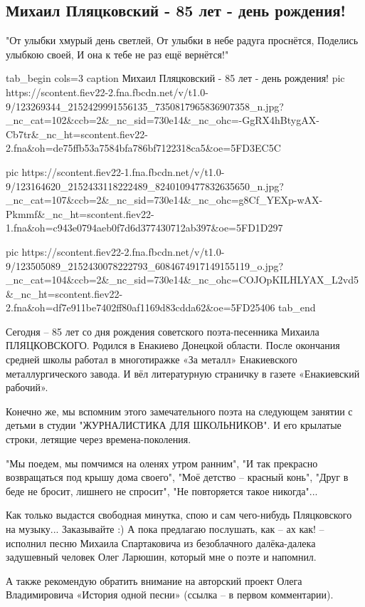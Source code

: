  
 
 

\subsection{Михаил Пляцковский - 85 лет - день рождения!}
\label{sec:02_11_2020.fb.roman_barashev.1.dr_mihail_pljackovskii_85}

\obeycr
"От улыбки хмурый день светлей,
От улыбки в небе радуга проснётся,
Поделись улыбкою своей,
И она к тебе не раз ещё вернётся!"
\restorecr

\ifcmt
tab_begin cols=3
	caption Михаил Пляцковский - 85 лет - день рождения!
pic https://scontent.fiev22-2.fna.fbcdn.net/v/t1.0-9/123269344_2152429991556135_7350817965836907358_n.jpg?_nc_cat=102&ccb=2&_nc_sid=730e14&_nc_ohc=-GgRX4hBtygAX-Cb7tr&_nc_ht=scontent.fiev22-2.fna&oh=de75ffb53a7584bfa786bf7122318ca5&oe=5FD3EC5C

pic https://scontent.fiev22-1.fna.fbcdn.net/v/t1.0-9/123164620_2152433118222489_8240109477832635650_n.jpg?_nc_cat=107&ccb=2&_nc_sid=730e14&_nc_ohc=g8Cf_YEXp-wAX-Pkmmf&_nc_ht=scontent.fiev22-1.fna&oh=c943e0794aeb0f7d6d377430712ab397&oe=5FD1D297

pic https://scontent.fiev22-2.fna.fbcdn.net/v/t1.0-9/123505089_2152430078222793_6084674917149155119_o.jpg?_nc_cat=104&ccb=2&_nc_sid=730e14&_nc_ohc=COJOpKILHLYAX_L2vd5&_nc_ht=scontent.fiev22-2.fna&oh=df7e911be7402ff80af1169d83cdda62&oe=5FD25406
tab_end
\fi

Сегодня -- 85 лет со дня рождения советского поэта-песенника  Михаила
ПЛЯЦКОВСКОГО. Родился в Енакиево Донецкой области. После окончания средней
школы работал в многотиражке «За металл» Енакиевского металлургического завода.
И вёл литературную страничку в газете «Енакиевский рабочий».

Конечно же, мы вспомним этого замечательного поэта на следующем занятии с
детьми в студии "ЖУРНАЛИСТИКА ДЛЯ ШКОЛЬНИКОВ". И его крылатые строки, летящие
через времена-поколения.

"Мы поедем, мы помчимся на оленях утром ранним", "И так прекрасно возвращаться
под крышу дома своего", "Моё детство -- красный конь", "Друг в беде не бросит,
лишнего не спросит", "Не повторяется такое никогда"...

Как только выдастся свободная минутка, спою и сам чего-нибудь Пляцковского на
музыку... Заказывайте :) А пока предлагаю послушать, как -- ах как! -- исполнил
песню Михаила Спартаковича из безоблачного далёка-далека задушевный человек
Олег Ларюшин, который мне о поэте и напомнил. 

А также рекомендую обратить внимание на авторский проект Олега Владимировича
«История одной песни» (ссылка -- в первом комментарии).
